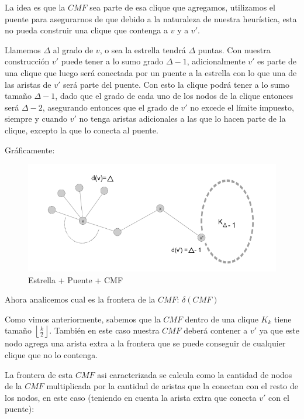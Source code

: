 La idea es que la $CMF$ sea parte de esa clique que agregamos, utilizamos el puente para asegurarnos
de que debido a la naturaleza de nuestra heur\'istica, esta no pueda construir una clique que contenga
a $v$ y a $v'$.

Llamemos $\Delta$ al grado de $v$, o sea la estrella tendr\'a $\Delta$ puntas. Con nuestra construcci\'on 
$v'$ puede tener a lo sumo grado $\Delta -1$, adicionalmente $v'$ es parte de una clique que luego ser\'a 
conectada por un puente a la estrella con lo que una de las aristas de $v'$ ser\'a parte del puente. 
Con esto la clique podr\'a tener a lo sumo tama\~no $\Delta -1$, dado que el grado de cada uno de los 
nodos de la clique entonces ser\'a $\Delta -2$, asegurando entonces que el grado de $v'$ no excede
el l\'imite impuesto, siempre y cuando $v'$ no tenga aristas adicionales a las que lo hacen 
parte de la clique, excepto la que lo conecta al puente.

Gr\'aficamente:
\begin{figure}[H]
\caption{Estrella + Puente + CMF}
\label{fig:epcmf_carac}
\begin{center} 
	\includegraphics[scale = 0.6]{img/ej3/constructiva_golosa/vnotincmf_carac1.png} 
\end{center}
\end{figure}

Ahora analicemos cual es la frontera de la $CMF$: $\delta (CMF)$

Como vimos anteriormente, sabemos que la $CMF$ dentro de una clique $K_k$ tiene tama\~no
$\left\lfloor \frac{k}{2} \right \rfloor$. Tambi\'en en este caso nuestra $CMF$ deber\'a
contener a $v'$ ya que este nodo agrega una arista extra a la frontera que se puede conseguir
de cualquier clique que no lo contenga.

La frontera de esta $CMF$ asi caracterizada se calcula como la cantidad de nodos de la $CMF$
multiplicada por la cantidad de aristas que la conectan con el resto de los nodos, en este caso
(teniendo en cuenta la arista extra que conecta $v'$ con el puente):

